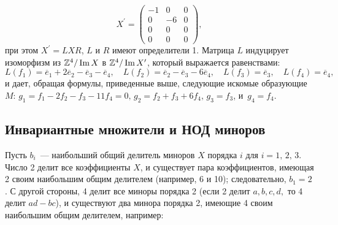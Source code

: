     \[ X^\prime = \begin{pmatrix}
    -1 & 0 & 0\\
    0 & -6 & 0\\
    0 & 0 & 0\\
    0 & 0 & 0
    \end{pmatrix},
    \] при этом $X^\prime = LXR$, $L$ и $R$ имеют определители 1. Матрица $L$ индуцирует изоморфизм из $\mathbb{Z}^4/\operatorname{Im}{X}$ в $\mathbb{Z}^4/\operatorname{Im}{X}^\prime$, который выражается равенствами:
    $$ L(f_1) = \overline{e}_1 + 2\overline{e}_2-\overline{e}_3-\overline{e}_4,\quad L(f_2) = \overline{e}_2-\overline{e}_3-6\overline{e}_4,\quad L(f_3) = \overline{e}_3,\quad L(f_4) = \overline{e}_4,$$
    и дает, обращая формулы, приведенные выше, следующие искомые образующие $M$: $g_1 = f_1 - 2f_2 - f_3 - 11f_4 = 0,\,g_2 = f_2 + f_3 + 6f_4,\,g_3 = f_3$, и $\,g_4 = f_4$.

    \subsection{\normalsize{Инвариантные множители и НОД миноров}}

    Пусть $b_i$~— наибольший общий делитель миноров $X$ порядка $i$ для \linebreak $i = 1,\,2,\,3$.
    Число 2 делит все коэффициенты $X$, и существует пара коэффициентов, имеющая 2 своим наибольшим общим делителем (например, 6 и 10); следовательно, $b_1 = 2$. С другой стороны, 4 делит все миноры порядка 2 (если 2 делит $a, b, c, d,$ то 4 делит $ad - bc$), и существуют два минора порядка 2, имеющие 4 своим наибольшим общим делителем, например:

